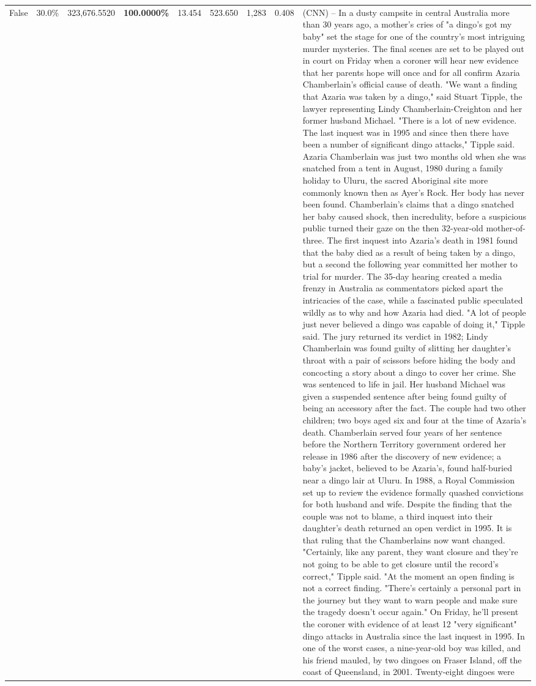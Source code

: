\begin{table}[H]
\begin{tabular}{lllrlllll}
False & 30.0\% & 323,676.5520 & \bfseries \color{red} 100.0000\% & 13.454 & 523.650 & 1,283 & 0.408 & (CNN) -- In a dusty campsite in central Australia more than 30 years ago, a mother's cries of "a dingo's got my baby" set the stage for one of the country's most intriguing murder mysteries. The final scenes are set to be played out in court on Friday when a coroner will hear new evidence that her parents hope will once and for all confirm Azaria Chamberlain's official cause of death. "We want a finding that Azaria was taken by a dingo," said Stuart Tipple, the lawyer representing Lindy Chamberlain-Creighton and her former husband Michael. "There is a lot of new evidence. The last inquest was in 1995 and since then there have been a number of significant dingo attacks," Tipple said. Azaria Chamberlain was just two months old when she was snatched from a tent in August, 1980 during a family holiday to Uluru, the sacred Aboriginal site more commonly known then as Ayer's Rock. Her body has never been found. Chamberlain's claims that a dingo snatched her baby caused shock, then incredulity, before a suspicious public turned their gaze on the then 32-year-old mother-of-three. The first inquest into Azaria's death in 1981 found that the baby died as a result of being taken by a dingo, but a second the following year committed her mother to trial for murder. The 35-day hearing created a media frenzy in Australia as commentators picked apart the intricacies of the case, while a fascinated public speculated wildly as to why and how Azaria had died. "A lot of people just never believed a dingo was capable of doing it," Tipple said. The jury returned its verdict in 1982; Lindy Chamberlain was found guilty of slitting her daughter's throat with a pair of scissors before hiding the body and concocting a story about a dingo to cover her crime. She was sentenced to life in jail. Her husband Michael was given a suspended sentence after being found guilty of being an accessory after the fact. The couple had two other children; two boys aged six and four at the time of Azaria's death. Chamberlain served four years of her sentence before the Northern Territory government ordered her release in 1986 after the discovery of new evidence; a baby's jacket, believed to be Azaria's, found half-buried near a dingo lair at Uluru. In 1988, a Royal Commission set up to review the evidence formally quashed convictions for both husband and wife. Despite the finding that the couple was not to blame, a third inquest into their daughter's death returned an open verdict in 1995. It is that ruling that the Chamberlains now want changed. "Certainly, like any parent, they want closure and they're not going to be able to get closure until the record's correct," Tipple said. "At the moment an open finding is not a correct finding. "There's certainly a personal part in the journey but they want to warn people and make sure the tragedy doesn't occur again." On Friday, he'll present the coroner with evidence of at least 12 "very significant" dingo attacks in Australia since the last inquest in 1995. In one of the worst cases, a nine-year-old boy was killed, and his friend mauled, by two dingoes on Fraser Island, off the coast of Queensland, in 2001. Twenty-eight dingoes were 
\end{tabular}
\end{table}
